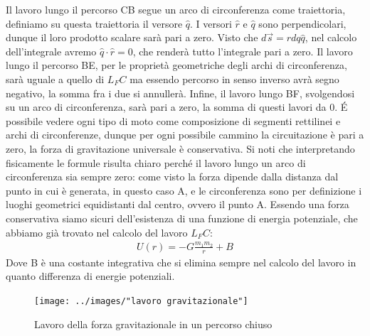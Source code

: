 Il lavoro lungo il percorso CB segue un arco di circonferenza come traiettoria, definiamo su questa traiettoria il versore $\hat{q}$. I versori $\hat{r}$ e $\hat{q}$ sono perpendicolari, dunque il loro prodotto scalare sarà pari a zero. Visto che $d\vec{s} = r dq \hat{q}$, nel calcolo dell'integrale avremo $\hat{q} \cdot \hat{r}= 0$, che renderà tutto l'integrale pari a zero. Il lavoro lungo il percorso BE, per le proprietà geometriche degli archi di circonferenza, sarà uguale a quello di $L_FC$ ma essendo percorso in senso inverso avrà segno negativo, la somma fra i due si annullerà. Infine, il lavoro lungo BF, svolgendosi su un arco di circonferenza, sarà pari a zero, la somma di questi lavori da 0. \'{E} possibile vedere ogni tipo di moto come composizione di segmenti rettilinei e archi di circonferenze, dunque per ogni possibile cammino la circuitazione è pari a zero, la forza di gravitazione universale è conservativa. Si noti che interpretando fisicamente le formule risulta chiaro perché il lavoro lungo un arco di circonferenza sia sempre zero: come visto la forza dipende dalla distanza dal punto in cui è generata, in questo caso A, e le circonferenza sono per definizione i luoghi geometrici equidistanti dal centro, ovvero il punto A.
Essendo una forza conservativa siamo sicuri dell'esistenza di una funzione di energia potenziale, che abbiamo già trovato nel calcolo del lavoro $L_FC$: 
\begin{align*}
	U(r) = -G\frac{m_1m_2}{r}+B
\end{align*}
Dove B è una costante integrativa che si elimina sempre nel calcolo del lavoro in quanto differenza di energie potenziali. \\
\begin{figure}[h!]
	\centering
	\texttt{[image: ../images/"lavoro gravitazionale"]}
	\caption{Lavoro della forza gravitazionale in un percorso chiuso}
	\label{fig:lavoro-gravitazionale}
\end{figure}
\FloatBarrier
\newpage
